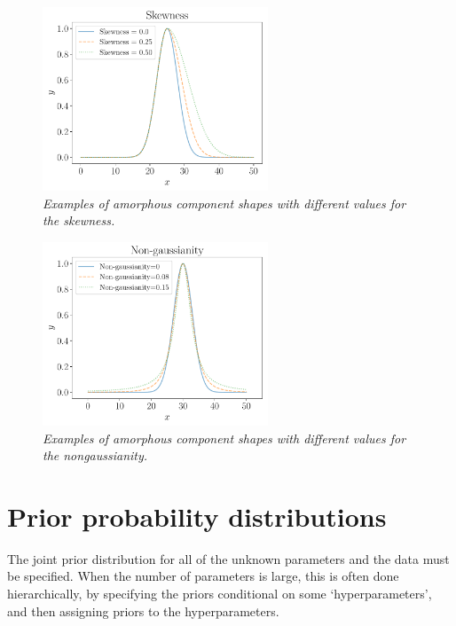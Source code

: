 \documentclass[review]{elsarticle}
\begin{document}
\begin{figure}[!ht]
\centering
\includegraphics[width=0.6\textwidth]{figures/skewness.pdf}
\caption{\it Examples of amorphous component shapes with different values
for the skewness.\label{fig:skewness}}
\end{figure}

\begin{figure}[!ht]
\centering
\includegraphics[width=0.6\textwidth]{figures/nongaussianity.pdf}
\caption{\it Examples of amorphous component shapes with different values
for the nongaussianity.\label{fig:nongaussianity}}
\end{figure}

\section{Prior probability distributions}\label{sec:priors}
The joint prior distribution for all of the unknown parameters and
the data must be specified.
When the number of parameters is large, this is often done hierarchically, by
specifying the priors conditional on some `hyperparameters', and then assigning
priors to the hyperparameters.
\end{document}
